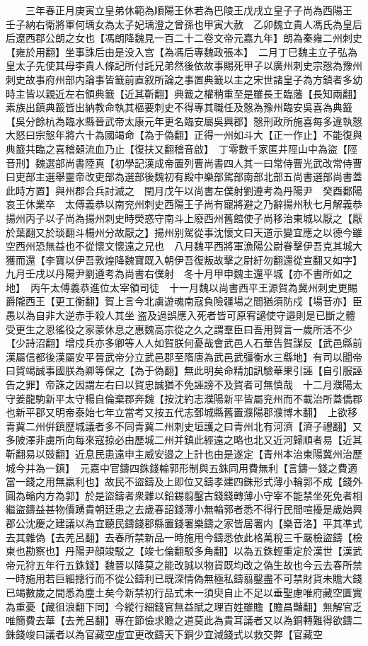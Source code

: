 　　三年春正月庚寅立皇弟休範為順陽王休若為巴陵王戊戌立皇子子尚為西陽王　壬子納右衛將軍何瑀女為太子妃瑀澄之曾孫也甲寅大赦　乙卯魏立貴人馮氏為皇后后遼西郡公朗之女也【馮朗降魏見一百二十二卷文帝元嘉九年】朗為秦雍二州刺史【雍於用翻】坐事誅后由是没入宫【為馮后專魏政張本】　二月丁巳魏主立子弘為皇太子先使其母李貴人條記所付託兄弟然後依故事賜死甲子以廣州刺史宗慤為豫州刺史故事府州部内論事皆籖前直叙所論之事置典籖以主之宋世諸皇子為方鎮者多幼時主皆以親近左右領典籖【近其靳翻】典籖之權稍重至是雖長王臨藩【長知兩翻】素族出鎮典籖皆出納教命執其樞要刺史不得專其職任及慤為豫州臨安吳喜為典籖【吳分餘杭為臨水縣晉武帝太康元年更名臨安屬吳興郡】慤刑政所施喜每多違執慤大怒曰宗慤年將六十為國竭命【為于偽翻】正得一州如斗大【正一作止】不能復與典籖共臨之喜稽顙流血乃止【復扶又翻稽音啟】　丁零數千家匿井陘山中為盜【陘音刑】魏選部尚書陸真【初學記漢成帝置列曹尚書四人其一曰常侍曹光武改常侍曹曰吏部主選舉靈帝改吏部為選部後魏初有殿中樂部駕部南部北部五尚書選部尚書蓋此時方置】與州郡合兵討滅之　閏月戊午以尚書左僕射劉遵考為丹陽尹　癸酉鄱陽哀王休業卒　太傅義恭以南兖州刺史西陽王子尚有寵將避之乃辭揚州秋七月解義恭揚州丙子以子尚為揚州刺史時熒惑守南斗上廢西州舊館使子尚移治東城以厭之【厭於葉翻又於琰翻斗楊州分故厭之】揚州别駕從事沈懷文曰天道示變宜應之以德今雖空西州恐無益也不從懷文懷遠之兄也　八月魏平西將軍漁陽公尉眷擊伊吾克其城大獲而還【李寶以伊吾敦煌降魏寶既入朝伊吾復叛故擊之尉紆勿翻還從宣翻又如字】　九月壬戌以丹陽尹劉遵考為尚書右僕射　冬十月甲申魏主還平城【亦不書所如之地】　丙午太傅義恭進位太宰領司徒　十一月魏以尚書西平王源賀為冀州刺史更賜爵隴西王【更工衡翻】賀上言今北虜遊魂南寇負險疆場之間猶須防戍【場音亦】臣愚以為自非大逆赤手殺人其坐盗及過誤應入死者皆可原宥讁使守邉則是已斷之體受更生之恩徭役之家蒙休息之惠魏高宗從之久之謂羣臣曰吾用賀言一歲所活不少【少詩沼翻】增戍兵亦多卿等人人如賀朕何憂哉會武邑人石華告賀謀反【武邑縣前漢屬信都後漢屬安平晉武帝分立武邑郡至隋唐為武邑武彊衡水三縣地】有司以聞帝曰賀竭誠事國朕為卿等保之【為于偽翻】無此明矣命精加訊驗華果引誣【自引服誣告之罪】帝誅之因謂左右曰以賀忠誠猶不免誣謗不及賀者可無慎哉　十二月濮陽太守姜龍駒新平太守楊自倫棄郡奔魏【按沈約志濮陽新平皆屬兖州而不載治所蓋僑郡也新平郡又明帝泰始七年立當考又按五代志鄄城縣舊置濮陽郡濮博木翻】　上欲移青冀二州倂鎮歷城議者多不同青冀二州刺史垣護之曰青州北有河濟【濟子禮翻】又多陂澤非虜所向每來寇掠必由歷城二州并鎮此經遠之略也北又近河歸順者易【近其靳翻易以豉翻】近息民患遠申主威安邉之上計也由是遂定【青州本治東陽冀州治歷城今并為一鎮】　元嘉中官鑄四銖錢輪郭形制與五銖同用費無利【言鑄一錢之費適當一錢之用無羸利也】故民不盜鑄及上即位又鑄孝建四銖形式薄小輪郭不成【錢外圓為輪内方為郭】於是盜鑄者衆雜以鉛錫翦鑿古錢錢轉薄小守宰不能禁坐死免者相繼盜鑄益甚物價踴貴朝廷患之去歲春詔錢薄小無輪郭者悉不得行民間喧擾是歲始興郡公沈慶之建議以為宜聽民鑄錢郡縣置錢署樂鑄之家皆居署内【樂音洛】平其凖式去其雜偽【去羌呂翻】去春所禁新品一時施用今鑄悉依此格萬稅三千嚴檢盜鑄【檢柬也勘察也】丹陽尹顔竣駁之【竣七倫翻駁多角翻】以為五銖輕重定於漢世【漢武帝元狩五年行五銖錢】魏晉以降莫之能改誠以物貨既均改之偽生故也今云去春所禁一時施用若巨細摠行而不從公鑄利已既深情偽無極私鑄翦鑿盡不可禁財貨未贍大錢已竭數歲之間悉為塵土矣今新禁初行品式未一須臾自止不足以垂聖慮唯府藏空匱實為重憂【藏徂浪翻下同】今縱行細錢官無益賦之理百姓雖贍【贍昌豔翻】無解官乏唯簡費去華【去羌呂翻】專在節儉求贍之道莫此為貴耳議者又以為銅轉難得欲鑄二銖錢竣曰議者以為官藏空虛宜更改鑄天下銅少宜減錢式以救交弊【官藏空